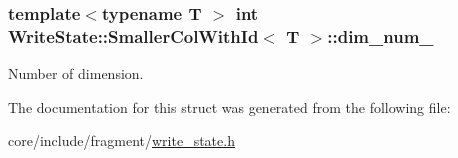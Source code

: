 \subsubsection[{dim\+\_\+num\+\_\+}]{\setlength{\rightskip}{0pt plus 5cm}template$<$typename T $>$ int {\bf Write\+State\+::\+Smaller\+Col\+With\+Id}$<$ T $>$\+::dim\+\_\+num\+\_\+}\label{structWriteState_1_1SmallerColWithId_a607c277cc7996a739d6b0a09e7cc883c}
Number of dimension. 

The documentation for this struct was generated from the following file\+:\begin{DoxyCompactItemize}
\item 
core/include/fragment/\hyperlink{write__state_8h}{write\+\_\+state.\+h}\end{DoxyCompactItemize}
